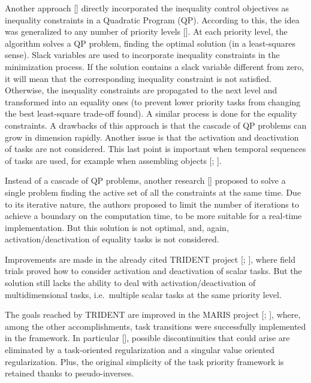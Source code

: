 Another approach [\cite{IntroTpik25}] directly incorporated the inequality control objectives as inequality constraints in a Quadratic Program (QP). According to this, the idea was generalized to any number of priority levels [\cite{IntroTpik26}]. At each priority level, the algorithm solves a QP problem, finding the optimal solution (in a least-squares sense). Slack variables are used to incorporate inequality constraints in the minimization process. If the solution contains a slack variable different from zero, it will mean that the corresponding inequality constraint is not satisfied. Otherwise, the inequality constraints are propagated to the next level and transformed into an equality ones (to prevent lower priority tasks from changing the best least-square trade-off found). A similar process is done for the equality constraints. A drawbacks of this approach is that the cascade of QP problems can grow  in dimension rapidly. Another issue is that the activation and deactivation of tasks are not considered. This last point is important when temporal sequences of tasks are used, for example when  assembling objects [\cite{IntroTpik28}; \cite{IntroTpik27}].

Instead of a cascade of QP problems, another research [\cite{IntroTpik29}] proposed to solve a single problem finding the active set of all the constraints at the same time. Due to its iterative nature, the authors proposed to limit the number of iterations to achieve a boundary on the computation time, to be more suitable for a real-time implementation. But this solution is not optimal, and, again, activation/deactivation of equality tasks is not considered.

Improvements are made in the already cited TRIDENT project [\cite{IntroTrident1}; \cite{IntroTrident4}], where field trials proved how to consider activation and deactivation of scalar tasks. But the solution still lacks the ability to deal with activation/deactivation of multidimensional tasks, i.e.\ multiple scalar tasks at the same priority level.

The goals reached by TRIDENT are improved in the MARIS project [\cite{IntroMaris0}; \cite{IntroTpik30}], where, among the other accomplishments, task transitions were successfully implemented in the framework. In particular [\cite{IntroMaris1}], possible discontinuities that could arise are eliminated by a task-oriented regularization and a singular value oriented regularization. Plus, the original simplicity of the task priority framework is retained thanks to pseudo-inverses.


